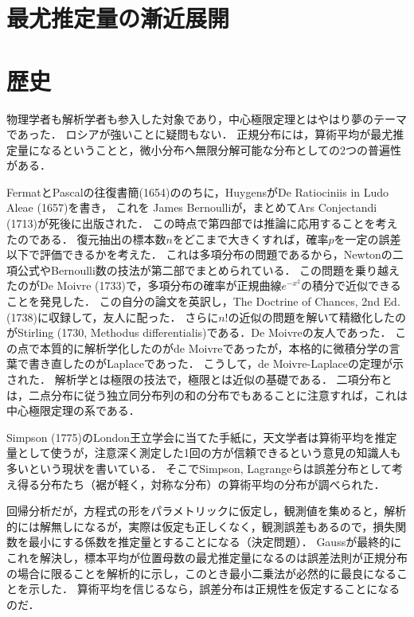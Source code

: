 \documentclass[uplatex,dvipdfmx]{jsreport}
\begin{document}
\section{最尤推定量の漸近展開}

\section{歴史}

\begin{tcolorbox}[colframe=ForestGreen, colback=ForestGreen!10!white,breakable,colbacktitle=ForestGreen!40!white,coltitle=black,fonttitle=\bfseries\sffamily,
title=]
    物理学者も解析学者も参入した対象であり，中心極限定理とはやはり夢のテーマであった．
    ロシアが強いことに疑問もない．
    正規分布には，算術平均が最尤推定量になるということと，微小分布へ無限分解可能な分布としての2つの普遍性がある．
\end{tcolorbox}

\begin{history}
    FermatとPascalの往復書簡(1654)ののちに，HuygensがDe  Ratiociniis in Ludo Aleae (1657)を書き，
    これを
    James Bernoulliが，まとめてArs Conjectandi (1713)が死後に出版された．
    この時点で第四部では推論に応用することを考えたのである．
    復元抽出の標本数$n$をどこまで大きくすれば，確率$p$を一定の誤差以下で評価できるかを考えた．
    これは多項分布の問題であるから，Newtonの二項公式やBernoulli数の技法が第二部でまとめられている．
    この問題を乗り越えたのがDe Moivre (1733)で，多項分布の確率が正規曲線$e^{-x^2}$の積分で近似できることを発見した．
    この自分の論文を英訳し，The Doctrine of Chances, 2nd Ed. (1738)に収録して，友人に配った．
    さらに$n!$の近似の問題を解いて精緻化したのがStirling (1730, Methodus differentialis)である．De Moivreの友人であった．
    この点で本質的に解析学化したのがde Moivreであったが，本格的に微積分学の言葉で書き直したのがLaplaceであった．
    こうして，de Moivre-Laplaceの定理が示された．
    解析学とは極限の技法で，極限とは近似の基礎である．
    二項分布とは，二点分布に従う独立同分布列の和の分布でもあることに注意すれば，これは中心極限定理の系である．
\end{history}

\begin{history}[誤差分布と天文学]
    Simpson (1775)のLondon王立学会に当てた手紙に，天文学者は算術平均を推定量として使うが，注意深く測定した1回の方が信頼できるという意見の知識人も多いという現状を書いている．
    そこでSimpson, Lagrangeらは誤差分布として考え得る分布たち（裾が軽く，対称な分布）の算術平均の分布が調べられた．

    回帰分析だが，方程式の形をパラメトリックに仮定し，観測値を集めると，解析的には解無しになるが，実際は仮定も正しくなく，観測誤差もあるので，損失関数を最小にする係数を推定量とすることになる（決定問題）．
    Gaussが最終的にこれを解決し，標本平均が位置母数の最尤推定量になるのは誤差法則が正規分布の場合に限ることを解析的に示し，このとき最小二乗法が必然的に最良になることを示した．
    算術平均を信じるなら，誤差分布は正規性を仮定することになるのだ．
\end{history}
\end{document}
